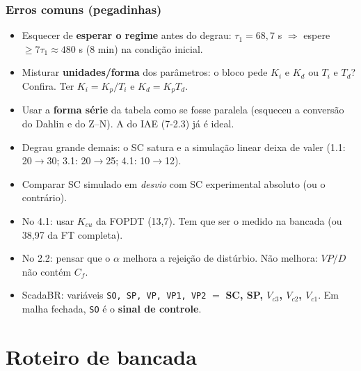 \documentclass[11pt,a4paper]{article}
\newcommand{\Vc}[1]{V_{c#1}}
\begin{document}
\section{Erros comuns (pegadinhas)}
\begin{itemize}
\item Esquecer de \textbf{esperar o regime} antes do degrau: $\tau_1=68{,}7$ s $\Rightarrow$ espere $\ge7\tau_1\approx480$ s (8 min) na condição inicial.
\item Misturar \textbf{unidades/forma} dos parâmetros: o bloco pede $K_i$ e $K_d$ ou $T_i$ e $T_d$? Confira. Ter $K_i=K_p/T_i$ e $K_d=K_pT_d$.
\item Usar a \textbf{forma série} da tabela como se fosse paralela (esqueceu a conversão do Dahlin e do Z--N). A do IAE (7-2.3) já é ideal.
\item Degrau grande demais: o SC satura e a simulação linear deixa de valer (1.1: 20$\to$30; 3.1: 20$\to$25; 4.1: 10$\to$12).
\item Comparar SC simulado em \emph{desvio} com SC experimental absoluto (ou o contrário).
\item No 4.1: usar $K_{cu}$ da FOPDT (13,7). Tem que ser o medido na bancada (ou 38,97 da FT completa).
\item No 2.2: pensar que o $\alpha$ melhora a rejeição de distúrbio. Não melhora: $VP/D$ não contém $C_f$.
\item ScadaBR: variáveis \texttt{SO, SP, VP, VP1, VP2} $=$ \textbf{SC, SP, $\Vc3$, $\Vc2$, $\Vc1$}. Em malha fechada, \texttt{SO} é o \textbf{sinal de controle}.
\end{itemize}

\newpage
\part{Roteiro de bancada}
\end{document}
